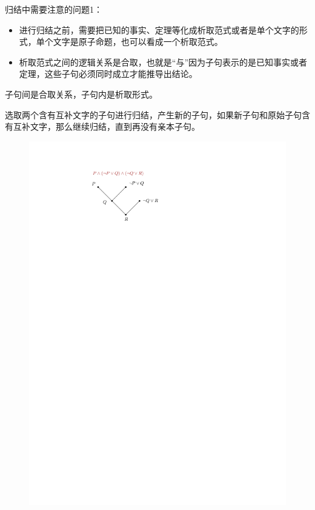 \begin{note}
    归结中需要注意的问题1：
    \begin{itemize}
        \item 进行归结之前，需要把已知的事实、定理等化成\textcolor{main1}{析取范式或者是单个文字的形式，}单个文字是原子命题，也可以看成一个析取范式。
        \item \textcolor{main1}{析取范式之间的逻辑关系是合取}，也就是“与”因为子句表示的是已知事实或者定理，这些子句必须同时成立才能推导出结论。
    \end{itemize}
    子句间是合取关系，子句内是析取形式。
\end{note}
\begin{example}
    选取两个含有互补文字的子句进行归结，产生新的子句，如果新子句和原始子句含有互补文字，那么继续归结，直到再没有亲本子句。
    \begin{figure}[htbp]
        \centering
        \includegraphics{image/归结.pdf}
    \end{figure}
\end{example}
